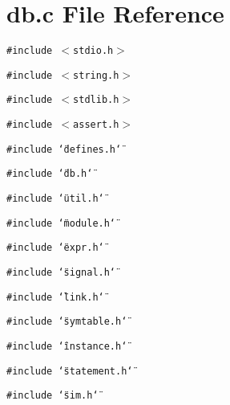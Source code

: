 \section{db.c File Reference}
\label{db_8c}
{\tt \#include $<$stdio.h$>$}\par
{\tt \#include $<$string.h$>$}\par
{\tt \#include $<$stdlib.h$>$}\par
{\tt \#include $<$assert.h$>$}\par
{\tt \#include \char`\"{}defines.h\char`\"{}}\par
{\tt \#include \char`\"{}db.h\char`\"{}}\par
{\tt \#include \char`\"{}util.h\char`\"{}}\par
{\tt \#include \char`\"{}module.h\char`\"{}}\par
{\tt \#include \char`\"{}expr.h\char`\"{}}\par
{\tt \#include \char`\"{}signal.h\char`\"{}}\par
{\tt \#include \char`\"{}link.h\char`\"{}}\par
{\tt \#include \char`\"{}symtable.h\char`\"{}}\par
{\tt \#include \char`\"{}instance.h\char`\"{}}\par
{\tt \#include \char`\"{}statement.h\char`\"{}}\par
{\tt \#include \char`\"{}sim.h\char`\"{}}\par
